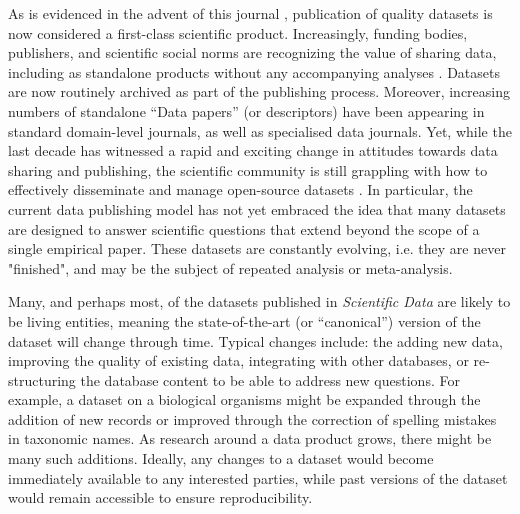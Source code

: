 \documentclass[a4paper,11pt]{article}
\begin{document}
As is evidenced in the advent of this journal \citep{Editorial-2014}, publication of quality datasets is now considered a first-class scientific product. Increasingly, funding bodies, publishers, and scientific social norms are recognizing the value of sharing data, including as standalone products without any accompanying analyses \citep[e.g.][]{Whitlock-2011,Fairbairn-2011,Piwowar-2011,VanNoorden-2013,Gibney-2013}. Datasets are now routinely archived as part of the publishing process. Moreover, increasing numbers of standalone ``Data papers'' (or descriptors) have been appearing in standard domain-level journals, as well as specialised data journals. Yet, while the last decade has witnessed a rapid and exciting change in attitudes towards data sharing and publishing, the scientific community is still grappling with how to effectively disseminate and manage open-source datasets \citep{Whitlock-2011, Goodman-2014, Lowndes-2017,Perkel-2016,VanNoorden-2013, Kratz-2015}. In particular, the current data publishing model has not yet embraced the idea that many  datasets are designed to answer scientific questions that extend beyond the scope of a single empirical paper.  These datasets are constantly evolving, i.e. they are never "finished", and may be the subject of repeated analysis or meta-analysis.

Many, and perhaps most, of the datasets published in \emph{Scientific Data} are likely to be living entities, meaning the state-of-the-art (or ``canonical'') version of the dataset will change through time. Typical changes include: the adding new data, improving the quality of existing data, integrating with other databases, or re-structuring the database content to be able to address new questions. For example, a dataset on a biological organisms might be expanded through the addition of new records or improved through the correction of spelling mistakes in taxonomic names. As research around a data product grows, there might be many such additions. Ideally, any changes to a dataset would become immediately available to any interested parties, while past versions of the dataset would remain accessible to ensure reproducibility.
\end{document}
